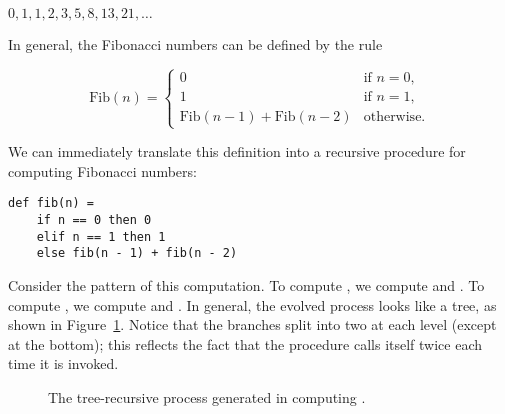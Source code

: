 $0, 1, 1, 2, 3, 5, 8, 13, 21, \ldots$

In general, the Fibonacci numbers can be defined by the rule

\begin{equation}
\text{Fib}(n) = \begin{cases}
0 & \text{if } n = 0, \\
1 & \text{if } n = 1, \\
\text{Fib}(n - 1) + \text{Fib}(n - 2) & \text{otherwise}.
\end{cases}
\end{equation}

We can immediately translate this definition into a recursive procedure for computing Fibonacci numbers:

\begin{lstlisting}
def fib(n) =
    if n == 0 then 0
    elif n == 1 then 1
    else fib(n - 1) + fib(n - 2)
\end{lstlisting}

Consider the pattern of this computation. To compute , we compute  and . To compute , we compute  and . In general, the evolved process looks like a tree, as shown in Figure~\ref{fig:tree-recursive-fib}. Notice that the branches split into two at each level (except at the bottom); this reflects the fact that the  procedure calls itself twice each time it is invoked.

\begin{figure}[h]
\centering
{}
\caption{The tree-recursive process generated in computing .}
\label{fig:tree-recursive-fib}
\end{figure}


